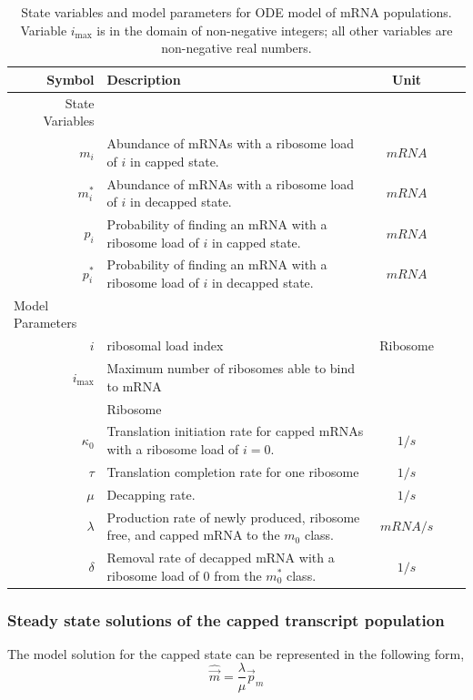 \documentclass[a4,center,fleqn]{NAR}
\newcommand{\imax}{\ensuremath{{i_{\max}}}\xspace}
\newcommand{\mvec}{\ensuremath{\vec{m}}\xspace}
\newcommand{\mvechat}{\ensuremath{\hat{\mvec}}\xspace}
\begin{document}
\begin{table}[!ht]
\begin{center}
\begin{tabular}{|rp{4in}|c|c|c|}\hline
\textbf{Symbol}&\textbf{Description}&\textbf{Unit} \\\hline
State Variables & &  \\ \hline
$m_i$ & Abundance of mRNAs with a ribosome load of $i$ in capped state. & $mRNA$ \\
$m_i^*$ & Abundance of mRNAs with a ribosome load of $i$ in decapped state. & $mRNA$ \\ \hline
$p_i$ & Probability of finding an mRNA with a ribosome load of $i$ in capped state. & $mRNA$ \\
$p_i^*$ & Probability of finding an mRNA with a ribosome load of $i$ in decapped state. & $mRNA$ \\ \hline
\multicolumn{1}{l}{Model Parameters} \\ \hline
$i$ & ribosomal load index & Ribosome\\
 \imax & Maximum number of ribosomes able to bind to mRNA\\ & Ribosome \\
$\kappa_0$ & Translation initiation rate for capped mRNAs with a ribosome load of $i=0$. & $1/s$\\
$\tau$ & Translation completion rate for one ribosome & $1/s$\\
$\mu $ & Decapping rate. & $1/s$\\
$\lambda$ & Production rate of newly produced, ribosome free, and capped mRNA to the $m_0$ class. & $mRNA/s$\\
$\delta$ & Removal rate of decapped mRNA with a ribosome load of 0 from the $m_0^*$ class. & $1/s$\\ \hline 
\end{tabular}
\caption{State variables and model parameters for ODE model of mRNA populations.
Variable \imax is in the domain of non-negative integers; all other variables are non-negative real numbers.}
\label{tab:params}
\end{center}
\end{table}


\subsubsection{Steady state solutions of the capped transcript population}
 The model solution for the capped state can be represented in the following form,
	\begin{equation} \label{eq:capped_solution}
		\mvechat=\frac{\lambda}{\mu}\vec{p}_m
	\end{equation}
\end{document}
